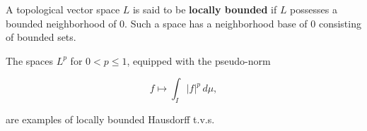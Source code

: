 A topological vector space $L$ is said to be \textbf{locally bounded} if $L$ possesses a bounded neighborhood of $0$. Such a space has a neighborhood base of $0$ consisting of bounded sets.

The spaces $L^p$ for $0 < p \leq 1$, equipped with the pseudo-norm

$$f \mapsto \int_I |f|^p \, d\mu,$$

are examples of locally bounded Hausdorff t.v.s.
